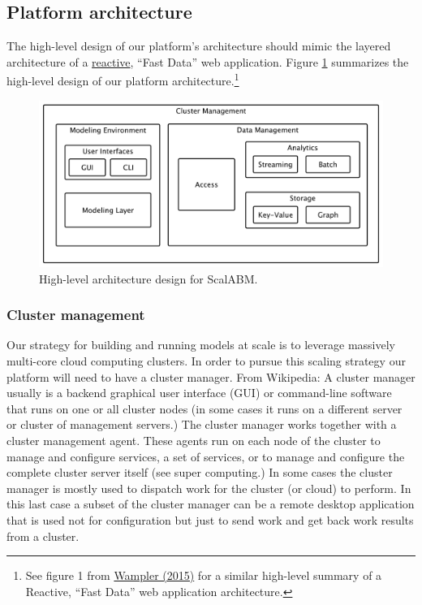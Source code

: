 \documentclass[11pt]{amsart}
\begin{document}
\subsection{Platform architecture}
The high-level design of our platform's architecture should mimic the layered architecture of a \href{http://www.reactivemanifesto.org/}{reactive}, ``Fast Data'' web application. Figure \ref{img-figure1} summarizes the high-level design of our platform architecture.\footnote{
%
See figure 1 from \href{./fast-data-big-data-evolved.pdf}{Wampler (2015)} for a similar high-level summary of a Reactive, ``Fast Data'' web application architecture.
%
}
\begin{figure}[H]\label{img-figure1}
\centering
\includegraphics[width=12cm]{img/coarse-grain-schema.pdf}
\caption{High-level architecture design for ScalABM.}
\end{figure}

\subsubsection{Cluster management} 
Our strategy for building and running models at scale is to leverage massively multi-core cloud computing clusters.  In order to pursue this scaling strategy our platform will need to have a cluster manager. From Wikipedia: A cluster manager usually is a backend graphical user interface (GUI) or command-line software that runs on one or all cluster nodes (in some cases it runs on a different server or cluster of management servers.) The cluster manager works together with a cluster management agent. These agents run on each node of the cluster to manage and configure services, a set of services, or to manage and configure the complete cluster server itself (see super computing.) In some cases the cluster manager is mostly used to dispatch work for the cluster (or cloud) to perform. In this last case a subset of the cluster manager can be a remote desktop application that is used not for configuration but just to send work and get back work results from a cluster. 
\end{document}
